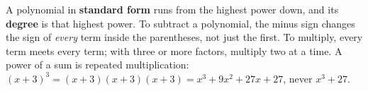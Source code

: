 \documentclass[12pt]{article}
\begin{document}
\vspace{0.14in}

\boxguard[8]
\begin{remindbox}
\small A polynomial in \textbf{standard form} runs from the highest power down, and its
\textbf{degree} is that highest power. To subtract a polynomial, the minus sign changes the sign
of \emph{every} term inside the parentheses, not just the first. To multiply, every term meets
every term; with three or more factors, multiply two at a time. A power of a sum is repeated
multiplication: $(x+3)^3=(x+3)(x+3)(x+3)=x^3+9x^2+27x+27$, never $x^3+27$.
\end{remindbox}
\end{document}
